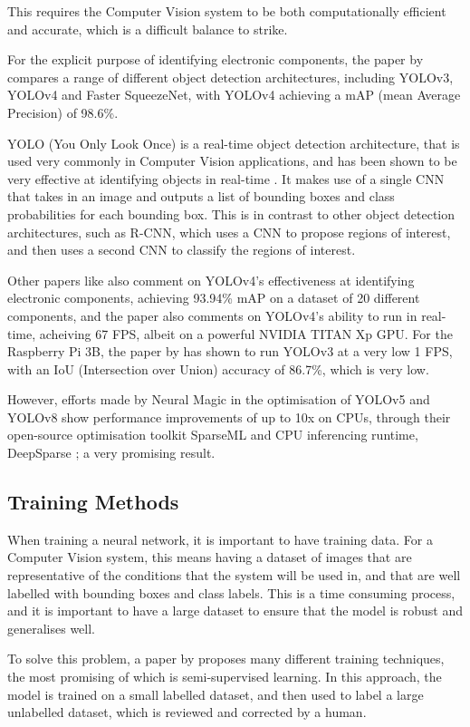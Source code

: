This requires the Computer Vision system to be both computationally efficient and accurate, which is a difficult balance to strike.

For the explicit purpose of identifying electronic components, the paper by \citet{s22239079} compares a range of different object detection architectures, including YOLOv3, YOLOv4 and Faster SqueezeNet, with YOLOv4 achieving a mAP (mean Average Precision) of 98.6\%.

YOLO (You Only Look Once) is a real-time object detection architecture, that is used very commonly in Computer Vision applications, and has been shown to be very effective at identifying objects in real-time \citet{yolo}. It makes
use of a single CNN that takes in an image and outputs a list of bounding boxes and class probabilities for each bounding box. This is in contrast to other object detection architectures, such as R-CNN, which uses a CNN to propose regions of interest, and then uses a second CNN to classify the regions of interest.

Other papers like \citet{Guo2021} also comment on YOLOv4's effectiveness at identifying electronic components, achieving 93.94\% mAP on a dataset of 20 different components, and the paper also comments
on YOLOv4's ability to run in real-time, acheiving 67 FPS, albeit on a powerful NVIDIA TITAN Xp GPU. For the Raspberry Pi 3B, the paper by \citet{9166199} has shown to run YOLOv3 at a very low 1 FPS,
with an IoU (Intersection over Union) accuracy of 86.7\%, which is very low. 

However, efforts made by Neural Magic \cite{neuralmagic} in the optimisation of YOLOv5 and YOLOv8 show performance improvements of up to 10x on CPUs, through their open-source 
optimisation toolkit SparseML \cite{sparseml} and CPU inferencing runtime, DeepSparse \cite{deepsparse}; a very promising result.

\subsection{Training Methods}
When training a neural network, it is important to have training data. For a Computer Vision system, this means having a dataset of images that are representative of the conditions that the system will be used in, and
that are well labelled with bounding boxes and class labels. This is a time consuming process, and it is important to have a large dataset to ensure that the model is robust and generalises well.

To solve this problem, a paper by \citet{Yang_2023} proposes many different training techniques, the most promising of which is semi-supervised learning. In this approach, the model is trained on a small labelled dataset, and then
used to label a large unlabelled dataset, which is reviewed and corrected by a human.


